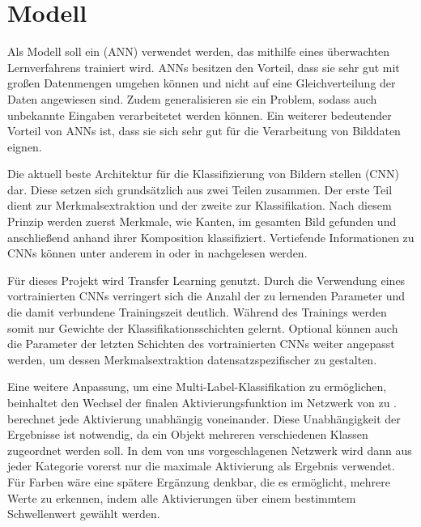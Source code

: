 \section{Modell} \label{sec:model}

Als Modell soll ein  (ANN) verwendet werden, das mithilfe eines überwachten Lernverfahrens trainiert wird. ANNs besitzen den Vorteil, dass sie sehr gut mit großen Datenmengen umgehen können und nicht auf eine Gleichverteilung der Daten angewiesen sind. Zudem generalisieren sie ein Problem, sodass auch unbekannte Eingaben verarbeitetet werden können. Ein weiterer bedeutender Vorteil von ANNs ist, dass sie sich sehr gut für die Verarbeitung von Bilddaten eignen. \cite{Mahanta2020}

Die aktuell beste Architektur für die Klassifizierung von Bildern stellen  (CNN) dar. Diese setzen sich grundsätzlich aus zwei Teilen zusammen. Der erste Teil dient zur Merkmalsextraktion und der zweite zur Klassifikation. Nach diesem Prinzip werden zuerst Merkmale, wie Kanten, im gesamten Bild gefunden und anschließend anhand ihrer Komposition klassifiziert. Vertiefende Informationen zu CNNs können unter anderem in \cite{Goodfellow2016} oder in \cite{CS2020} nachgelesen werden.

Für dieses Projekt wird Transfer Learning genutzt. Durch die Verwendung eines vortrainierten CNNs verringert sich die Anzahl der zu lernenden Parameter und die damit verbundene Trainingszeit deutlich. Während des Trainings werden somit nur Gewichte der Klassifikationsschichten gelernt. Optional können auch die Parameter der letzten Schichten des vortrainierten CNNs weiter angepasst werden, um dessen Merkmalsextraktion datensatzspezifischer zu gestalten.

Eine weitere Anpassung, um eine Multi-Label-Klassifikation zu ermöglichen, beinhaltet den Wechsel der finalen Aktivierungsfunktion im Netzwerk von  zu .  berechnet jede Aktivierung unabhängig voneinander. Diese Unabhängigkeit der Ergebnisse ist notwendig, da ein Objekt mehreren verschiedenen Klassen zugeordnet werden soll. In dem von uns vorgeschlagenen Netzwerk wird dann aus jeder Kategorie vorerst nur die maximale Aktivierung als Ergebnis verwendet. Für Farben wäre eine spätere Ergänzung denkbar, die es ermöglicht, mehrere Werte zu erkennen, indem alle Aktivierungen über einem bestimmtem Schwellenwert gewählt werden. 

